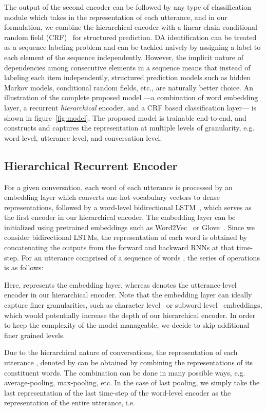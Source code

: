 \documentclass[letterpaper]{article} \usepackage{aaai18}
\begin{document}
The output of the second encoder can be followed by any type of classification module which takes in the representation of each utterance, and in our formulation, we combine the hierarchical encoder with a linear chain conditional random field (CRF)~\cite{Lafferty2001} for structured prediction. DA identification can be treated as a sequence labeling problem and can be tackled naively by assigning a label to each element of the sequence independently. However, the implicit nature of dependencies among consecutive elements in a sequence means that instead of labeling each item independently, structured prediction models such as hidden Markov models, conditional random fields, etc., are naturally better choice. An illustration of the complete proposed model ---a combination of word embedding layer, a recurrent \textit{hierarchical} encoder, and a CRF based classification layer---  is shown in figure~\ref{fig:model}. The proposed model is trainable end-to-end, and constructs and captures the representation at multiple levels of granularity, e.g. word level, utterance level, and conversation level.
\subsection{Hierarchical Recurrent Encoder}
For a given conversation, each word  of each utterance  is processed by an embedding layer which converts one-hot vocabulary vectors to dense representations, followed by a word-level bidirectional LSTM~\cite{Hochreiter1997}, which serves as the first encoder in our hierarchical encoder. The embedding layer can be initialized using pretrained embeddings such as Word2Vec~\cite{Mikolov2013} or Glove~\cite{Pennington2014}. Since we consider bidirectional LSTMs, the representation of each word is obtained by concatenating the outputs from the forward and backward RNNs at that time-step. For an utterance  comprised of a sequence of words , the series of operations is as follows:

Here,  represents the embedding layer, whereas  denotes the utterance-level encoder in our hierarchical encoder. Note that the embedding layer can ideally capture finer granularities, such as character level~\cite{Kim2016} or subword level~\cite{Sennrich2016} embeddings, which would potentially increase the depth of our hierarchical encoder. In order to keep the complexity of the model manageable, we decide to skip additional finer grained levels.


Due to the hierarchical nature of conversations, the representation of each utterance , denoted by  can be obtained by combining the representations of its constituent words. The combination can be done in many possible ways, e.g. average-pooling, max-pooling, etc. In the case of last pooling, we simply take the last representation of the last time-step of the word-level encoder as the representation of the entire utterance, i.e. 
\end{document}
